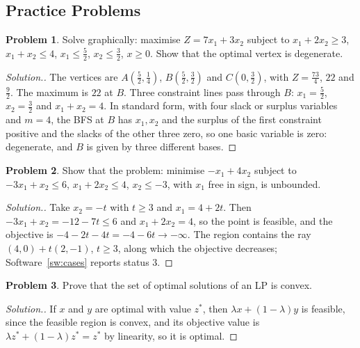 \documentclass[11pt,a4paper]{article}
\numberwithin{equation}{section}
\theoremstyle{definition}
\newtheorem{problemx}{Problem}[subsection]
\newenvironment{problem}{\begin{problemx}}{\end{problemx}}
\newenvironment{solution}
  {\renewcommand{\qedsymbol}{}\begin{proof}[\textit{Solution}.]}
  {\end{proof}}
\begin{document}
\subsection{Practice Problems}

\begin{problem}
Solve graphically: maximise $Z = 7x_1 + 3x_2$ subject to $x_1 + 2x_2 \geq 3$, $x_1 + x_2 \leq 4$, $x_1 \leq \frac52$, $x_2 \leq \frac32$, $x \geq 0$. Show that the optimal vertex is degenerate.
\end{problem}

\begin{solution}
The vertices are $A(\frac52, \frac14)$, $B(\frac52, \frac32)$ and $C(0, \frac32)$, with $Z = \frac{73}4$, $22$ and $\frac92$. The maximum is $22$ at $B$. Three constraint lines pass through $B$: $x_1 = \frac52$, $x_2 = \frac32$ and $x_1 + x_2 = 4$. In standard form, with four slack or surplus variables and $m = 4$, the BFS at
$B$ has $x_1, x_2$ and the surplus of the first constraint positive and the slacks of the other three zero, so one basic variable is zero: degenerate, and $B$ is given by three different bases.
\end{solution}

\begin{problem}
Show that the problem: minimise $-x_1 + 4x_2$ subject to $-3x_1 + x_2 \leq 6$, $x_1 + 2x_2 \leq 4$, $x_2 \leq -3$, with $x_1$ free in sign, is unbounded.
\end{problem}

\begin{solution}
Take $x_2 = -t$ with $t \geq 3$ and $x_1 = 4 + 2t$. Then $-3x_1 + x_2 = -12 - 7t \leq 6$ and $x_1 + 2x_2 = 4$, so the point is feasible, and the objective is $-4 - 2t - 4t = -4 - 6t \to -\infty$. The region contains the ray $(4, 0) + t(2, -1)$, $t \geq 3$, along which the objective
decreases; Software~\ref{sw:cases} reports status $3$.
\end{solution}

\begin{problem}
Prove that the set of optimal solutions of an LP is convex.
\end{problem}

\begin{solution}
If $x$ and $y$ are optimal with value $z^*$, then $\lambda x + (1 - \lambda)y$ is feasible, since the feasible region is convex, and its objective value is $\lambda z^* + (1 - \lambda)z^* = z^*$ by linearity, so it is optimal.
\end{solution}
\end{document}
